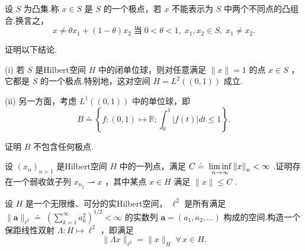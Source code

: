 \begin{rbhw}
设 $S$ 为凸集.称 $x \in  S$ 是 $S$ 的一个极点，若 $x$ 不能表示为 $S$ 中两个不同点的凸组合.换言之，
\[
x \neq  \theta {x}_{1} + \left( {1 - \theta }\right) {x}_{2}\;\text{当}\; 0 < \theta  < 1,\;{x}_{1},{x}_{2} \in  S,\;{x}_{1} \neq  {x}_{2}.
\]

证明以下结论.

(i) 若 $S$ 是Hilbert空间 $H$ 中的闭单位球，则对任意满足 $\| x\|  = 1$ 的点 $x \in  S$ ，它都是 $S$ 的一个极点.特别地，这对空间 $H = {L}^{2}\left( \left(  {0,1}\right)  \right)$ 成立.

(ii) 另一方面，考虑 ${L}^{1}\left( \left(  {0,1}\right)  \right)$ 中的单位球，即
\[
B \doteq  \left\{  {f : \left(  {0,1}\right)   \mapsto  \mathbb{R};{\int }_{0}^{1}\left| {f\left( t\right) }\right| {dt} \leq  1}\right\}  .
\]

证明 $B$ 不包含任何极点.
\end{rbhw}

\begin{rbhw}
设 ${\left( {x}_{n}\right) }_{n > 1}$ 是Hilbert空间 $H$ 中的一列点，满足 $C \doteq \; \mathop{\liminf }\limits_{{n \rightarrow  \infty }}\norm{x}_{n} < \infty$ .证明存在一个弱收敛子列 ${x}_{{n}_{j}} \rightharpoonup  x$ ，其中某点 $x \in  H$ 满足 $\| x\|  \leq  C$ .
\end{rbhw}

\begin{rbhw}
设 $H$ 是一个无限维、可分的实Hilbert空间， ${\ell }^{2}$ 是所有满足 $\| \bm{a}{\| }_{{\ell }^{2}} \doteq \; {\left( \sum\limits_{{k = 1}}^{\infty }{a}_{k}^{2}\right) }^{1/2} < \infty$ 的实数列 $\bm{a} = \left( {{a}_{1},{a}_{2},\ldots }\right)$ 构成的空间.构造一个保距线性双射 $\Lambda  : H \mapsto  {\ell }^{2}$ ，即满足
\[
\| {\Lambda x}{\| }_{{\ell }^{2}} = \| x{\| }_{H}\;\forall\,x \in  H.
\]
\end{rbhw}

